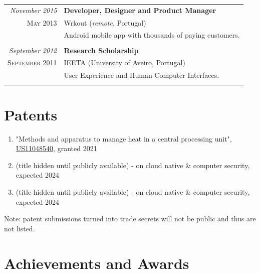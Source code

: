 \documentclass[letter,10pt]{article} %
\begin{document}
\begin{tabular}{r|p{13.4cm}}
	\emph{November 2015} & \textbf{Developer, Designer and Product Manager} \\
	\textsc{May 2013} & Wrkout (\textit{remote}, Portugal) \\
	& \footnotesize{Android mobile app with thousands of paying customers.}\\
	\multicolumn{2}{c}{}\\
	
	\emph{September 2012} & \textbf{Research Scholarship} \\
	\textsc{September 2011} &IEETA (University of Aveiro, Portugal) \\
	& \footnotesize{User Experience and Human-Computer Interfaces.}\\
	\multicolumn{2}{c}{}\\
	
\end{tabular}


\section{Patents}
\begin{enumerate}
	\item "Methods and apparatus to manage heat in a central processing unit", \href{https://patentimages.storage.googleapis.com/32/e3/4b/5e6bfda356c6f9/US11048540.pdf}{US11048540}, granted 2021
	\item (title hidden until publicly available) - on cloud native \& computer security, expected 2024
	\item (title hidden until publicly available) - on cloud native \& computer security, expected 2024
\end{enumerate}

Note: patent submissions turned into trade secrets will not be public and thus are not listed.


\section{Achievements and Awards}
\end{document}
